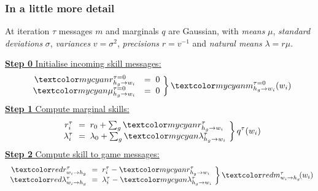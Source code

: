 \begin{frame}
\frametitle{In a little more detail}

At iteration $\tau$ messages $m$ and marginals $q$ are Gaussian,
with \emph{means} $\mu$, \emph{standard deviations} $\sigma$, \emph{variances}
$v=\sigma^2$, \emph{precisions} $r=v^{-1}$ and \emph{natural means} $\lambda=r\mu$.

\underline{{\bf Step 0} Initialise incoming skill messages:}
\[
\left.\begin{array}{rl} 
\Cyan{r^{\tau=0}_{h_g\rightarrow w_i}}&=\;0\\
\Cyan{\mu^{\tau=0}_{h_g\rightarrow w_i}}&=\;0
\end{array}\!\right\} \Cyan{m^{\tau=0}_{h_g\rightarrow w_i}(w_i)}
\]
\underline{{\bf Step 1} Compute marginal skills:}
\[
\left.\begin{array}{rl} 
r^\tau_i\!\!&=\;r_0+\sum_g \Cyan{r^\tau_{h_g\rightarrow w_i}}\\
\lambda^\tau_i\!\!&=\;\lambda_0+\sum_g \Cyan{\lambda^\tau_{h_g\rightarrow w_i}}
\end{array}\!\right\} q^\tau(w_i)
\]
\underline{{\bf Step 2} Compute skill to game messages:}
\[
\left.\begin{array}{rl}
\Red{r^\tau_{w_i\rightarrow h_g}}\!\!&=\;r^\tau_i-\Cyan{r^\tau_{h_g\rightarrow w_i}}\\
\Red{\lambda^\tau_{w_i\rightarrow h_g}}\!\!&=\;\lambda^\tau_i-\Cyan{\lambda^\tau_{h_g\rightarrow w_i}}
\end{array}\!\right\} \Red{m^\tau_{w_i\rightarrow h_g}\!(w_i)}
\]
\end{frame}


